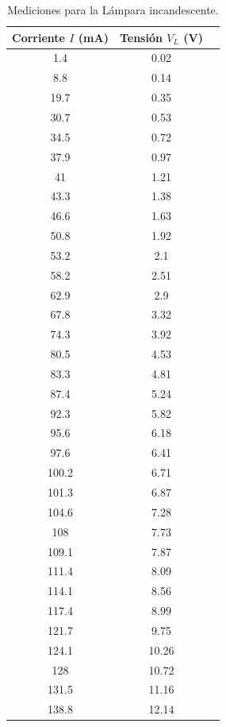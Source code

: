 \begin{table}[htpb]
    \centering
    \begin{tabular}{ccc}
        \toprule
        Corriente $I$ (mA) & Tensión $V_L$ (V) \\
        \midrule
        1.4 &	0.02 \\
        8.8 &	0.14 \\
        19.7 &	0.35 \\
        30.7 &	0.53 \\
        34.5 &	0.72 \\
        37.9 &	0.97 \\
        41 &	1.21 \\
        43.3 &	1.38 \\
        46.6 &	1.63 \\
        50.8 &	1.92 \\
        53.2 &	2.1 \\
        58.2 &	2.51 \\
        62.9 &	2.9 \\
        67.8 &	3.32 \\
        74.3 &	3.92 \\
        80.5 &	4.53 \\
        83.3 &	4.81 \\
        87.4 &	5.24 \\
        92.3 &	5.82 \\
        95.6 &	6.18 \\
        97.6 &	6.41 \\
        100.2 &	6.71 \\
        101.3 &	6.87 \\
        104.6 &	7.28 \\
        108 &	7.73 \\
        109.1 &	7.87 \\
        111.4 &	8.09 \\
        114.1 &	8.56 \\
        117.4 &	8.99 \\
        121.7 &	9.75 \\
        124.1 &	10.26 \\
        128 &	10.72 \\
        131.5 &	11.16 \\
        138.8 &	12.14 \\
        \bottomrule
    \end{tabular}
    \caption{Mediciones para la Lámpara incandescente.}
    \label{tab:lampara}
\end{table}


